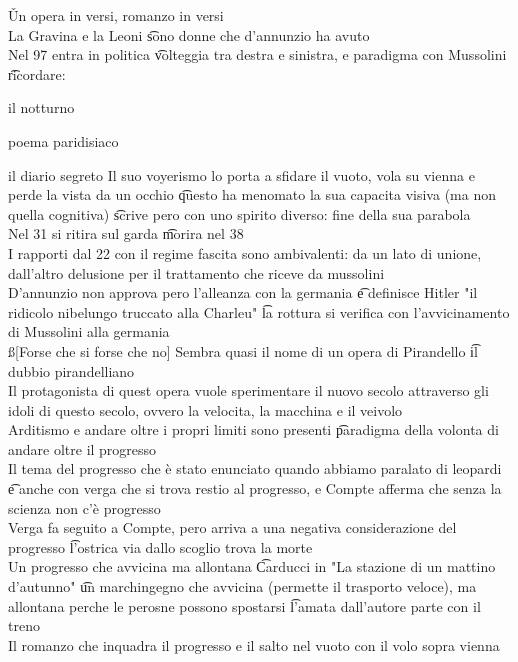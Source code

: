 \documentclass[12pt]{article}
\begin{document}
\v

Un opera in versi, romanzo in versi \\
La Gravina e la Leoni \t sono donne che d'annunzio ha avuto \\
Nel 97 entra in politica \t volteggia tra destra e sinistra, e paradigma con Mussolini \t ricordare:
\bi
  \item il notturno
  \item poema paridisiaco
  \item il diario segreto
\ei
Il suo voyerismo lo porta a sfidare il vuoto, vola su vienna e perde la vista da un occhio \t questo ha menomato la sua capacita visiva (ma non quella cognitiva) \t scrive pero con uno spirito diverso: fine della sua parabola \\
Nel 31 si ritira sul garda \t morira nel 38 \\
I rapporti dal 22 con il regime fascita sono ambivalenti: da un lato di unione, dall'altro delusione per il trattamento che riceve da mussolini \\
D'annunzio non approva pero l'alleanza con la germania \t e definisce Hitler "il ridicolo nibelungo truccato alla Charleu" \t la rottura si verifica con l'avvicinamento di Mussolini alla germania \\

\ss[Forse che si forse che no]
Sembra quasi il nome di un opera di Pirandello \t il dubbio pirandelliano \\
Il protagonista di quest opera vuole sperimentare il nuovo secolo attraverso gli idoli di questo secolo, ovvero la velocita, la macchina e il veivolo \\
Arditismo e andare oltre i propri limiti sono presenti \t paradigma della volonta di andare oltre il progresso \\
Il tema del progresso che è stato enunciato quando abbiamo paralato di leopardi \t e anche con verga che si trova restio al progresso, e Compte afferma che senza la scienza non c'è progresso \\
Verga fa seguito a Compte, pero arriva a una negativa considerazione del progresso \t l'ostrica via dallo scoglio trova la morte \\
Un progresso che avvicina ma allontana \t Carducci in "La stazione di un mattino d'autunno" \t un marchingegno che avvicina (permette il trasporto veloce), ma allontana perche le perosne possono spostarsi \t l'amata dall'autore parte con il treno \\
Il romanzo che inquadra il progresso e il salto nel vuoto con il volo sopra vienna
\end{document}
